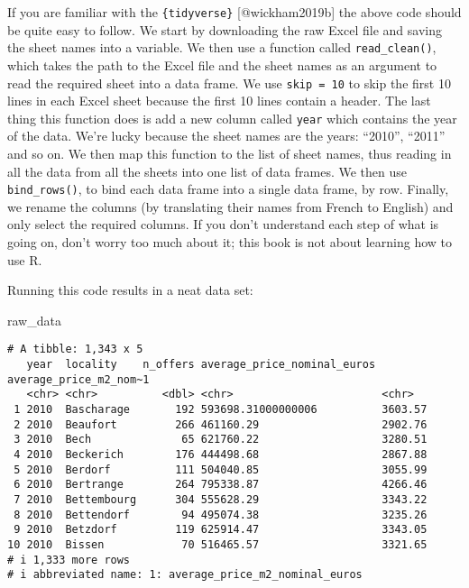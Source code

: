 \documentclass[
  letterpaper,
  DIV=11,
  numbers=noendperiod]{scrartcl}
\newenvironment{Shaded}{\begin{snugshade}}{\end{snugshade}}
\newcommand{\NormalTok}[1]{\textcolor[rgb]{0.00,0.23,0.31}{#1}}
\begin{document}
If you are familiar with the \texttt{\{tidyverse\}} {[}@wickham2019b{]}
the above code should be quite easy to follow. We start by downloading
the raw Excel file and saving the sheet names into a variable. We then
use a function called \texttt{read\_clean()}, which takes the path to
the Excel file and the sheet names as an argument to read the required
sheet into a data frame. We use \texttt{skip\ =\ 10} to skip the first
10 lines in each Excel sheet because the first 10 lines contain a
header. The last thing this function does is add a new column called
\texttt{year} which contains the year of the data. We're lucky because
the sheet names are the years: ``2010'', ``2011'' and so on. We then map
this function to the list of sheet names, thus reading in all the data
from all the sheets into one list of data frames. We then use
\texttt{bind\_rows()}, to bind each data frame into a single data frame,
by row. Finally, we rename the columns (by translating their names from
French to English) and only select the required columns. If you don't
understand each step of what is going on, don't worry too much about it;
this book is not about learning how to use R.

Running this code results in a neat data set:

\begin{Shaded}
\begin{Highlighting}[]
\NormalTok{raw\_data}
\end{Highlighting}
\end{Shaded}

\begin{verbatim}
# A tibble: 1,343 x 5
   year  locality    n_offers average_price_nominal_euros average_price_m2_nom~1
   <chr> <chr>          <dbl> <chr>                       <chr>                 
 1 2010  Bascharage       192 593698.31000000006          3603.57               
 2 2010  Beaufort         266 461160.29                   2902.76               
 3 2010  Bech              65 621760.22                   3280.51               
 4 2010  Beckerich        176 444498.68                   2867.88               
 5 2010  Berdorf          111 504040.85                   3055.99               
 6 2010  Bertrange        264 795338.87                   4266.46               
 7 2010  Bettembourg      304 555628.29                   3343.22               
 8 2010  Bettendorf        94 495074.38                   3235.26               
 9 2010  Betzdorf         119 625914.47                   3343.05               
10 2010  Bissen            70 516465.57                   3321.65               
# i 1,333 more rows
# i abbreviated name: 1: average_price_m2_nominal_euros
\end{verbatim}
\end{document}
